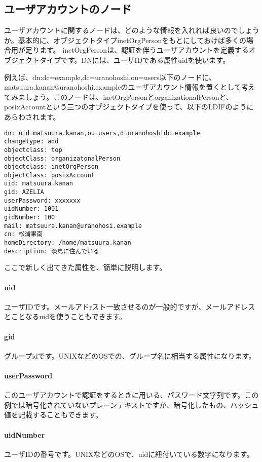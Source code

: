 \subsection{ユーザアカウントのノード}

ユーザアカウントに関するノードは、どのような情報を入れれば良いのでしょうか。基本的に、オブジェクトタイプinetOrgPersonをもとにしておけば多くの場合用が足ります。
inetOrgPersonは、認証を伴うユーザアカウントを定義するオブジェクトタイプです。DNには、ユーザIDである属性uidを使います。

例えば、dn:dc=example,dc=uranohoshi,ou=users以下のノードに、matsuura.kanan@uranohoshi.exampleのユーザアカウント情報を置くとして考えてみましょう。このノードは、inetOrgPersonとorganizationalPersonと、posixAccountという三つのオブジェクトタイプを使って、以下のLDIFのようにあらわされます。

\begin{verbatim}
dn: uid=matsuura.kanan,ou=users,d=uranohoshidc=example
changetype: add
objectclass: top
objectClass: organizatonalPerson
objectclass: inetOrgPerson
objectClass: posixAccount
uid: matsuura.kanan
gid: AZELIA
userPassword: xxxxxxx
uidNumber: 1001
gidNumber: 100
mail: matsuura.kanan@uranohosi.example
cn: 松浦果南
homeDirectory: /home/matsuura.kanan
description: 淡島に住んでいる
\end{verbatim}

ここで新しく出てきた属性を、簡単に説明します。

\paragraph{uid}
ユーザIDです。メールアドrスト一致させるのが一般的ですが、メールアドレスとことなるuidを使うこともできます。

\paragraph{gid}
グループidです。UNIXなどのOSでの、グループ名に相当する属性になります。

\paragraph{userPassword}
このユーザアカウントで認証をするときに用いる、パスワード文字列です。この例では暗号化されていないプレーンテキストですが、暗号化したもの、ハッシュ値を記載することもできます。

\paragraph{uidNumber}
ユーザIDの番号です。UNIXなどのOSで、uidに紐付いている数字になります。


